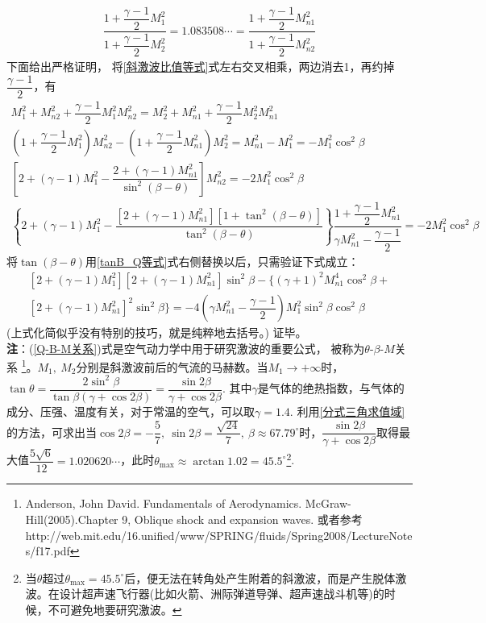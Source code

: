 \begin{enumerate}[label={【\textbf{例\thechapter.\arabic*}】},
 leftmargin=\inteval{\myenumleftmargin}pt,
 itemsep=\inteval{\myenumitempsep}pt,
 itemindent=\inteval{\myenumitemindent}pt]
\begin{align*}
    \dfrac{1+\dfrac{\gamma-1}{2}M_1^2}{1+\dfrac{\gamma-1}{2}M_2^2}
    =1.083508\cdots=
    \dfrac{1+\dfrac{\gamma-1}{2}M_{n1}^2}{1+\dfrac{\gamma-1}{2}M_{n2}^2}
\end{align*}
下面给出严格证明，
将\eqref{斜激波比值等式}式左右交叉相乘，两边消去1，再约掉$ \dfrac{\gamma-1}{2} $，有
\begin{gather*}
    M_1^2+M_{n2}^2+\dfrac{\gamma-1}{2}M_1^2M_{n2}^2=
    M_2^2+M_{n1}^2+\dfrac{\gamma-1}{2}M_2^2M_{n1}^2   \\
    \left(1+\dfrac{\gamma-1}{2}M_1^2\right)M_{n2}^2-
    \left(1+\dfrac{\gamma-1}{2}M_{n1}^2\right)M_{2}^2=M_{n1}^2-M_1^2
    =-M_1^2\cos^2\beta \\
    \left[2+(\gamma-1)M_1^2-\dfrac{2+(\gamma-1) M_{n1}^2}{\sin^2(\beta-\theta)}
    \right]M_{n2}^2=-2M_1^2\cos^2\beta \\
    \left\{2+(\gamma-1)M_1^2-\dfrac{[2+(\gamma-1) M_{n1}^2][1+
        \tan^2(\beta-\theta)]}{\tan^2(\beta-\theta)}
    \right\}\dfrac{1+\dfrac{\gamma-1}{2}M_{n1}^2}{\gamma M_{n1}^2
        -\dfrac{\gamma-1}{2}}=-2M_1^2\cos^2\beta
\end{gather*}
将$ \tan(\beta-\theta) $用\eqref{tanB_Q等式}式右侧替换以后，只需验证下式成立：
\begin{gather*}
    \left[2+(\gamma-1)M_1^2\right]\left[2+(\gamma-1)M_{n1}^2\right]\sin^2\beta-
    \Big\{(\gamma+1)^2M_{n1}^4\cos^2\beta+\\ [2+(\gamma-1) M_{n1}^2]^2
    \sin^2\beta \Big\}=-4\left(\gamma M_{n1}^2-\dfrac{\gamma-1}{2}\right)
    M_1^2\sin^2\beta\cos^2\beta
\end{gather*}
(上式化简似乎没有特别的技巧，就是纯粹地去括号。) 证毕。 \\
\textbf{注}：(\ref{Q-B-M关系})式是空气动力学中用于研究激波的重要公式，
被称为$ \theta$-$\beta$-$M$关系
\footnote{ Anderson, John David. Fundamentals of Aerodynamics. McGraw-Hill(2005).Chapter 9, Oblique shock and expansion waves. \quad  或者参考 http://web.mit.edu/16.unified/www/SPRING/fluids/Spring2008/LectureNotes/f17.pdf}。$ M_1,\ M_2 $分别是斜激波前后的气流的马赫数。当$ M_1\to +\infty $时，$ \tan\theta=\dfrac{2\sin^2\beta}{\tan\beta(\gamma+\cos2\beta)}=\dfrac{\sin2\beta}{\gamma+\cos2\beta} $. 其中$ \gamma $是气体的绝热指数，与气体的成分、压强、温度有关，对于常温的空气，可以取$ \gamma=1.4 $. 利用\ref{分式三角求值域}的方法，可求出当$ \cos2\beta=-\dfrac{5}{7},\ \sin2\beta=\dfrac{\sqrt{24}}{7},\ \beta\approx 67.79^{\circ} $时，$ \dfrac{\sin2\beta}{\gamma+\cos2\beta} $取得最大值$ \dfrac{5\sqrt{6}}{12}=1.020620\cdots $，此时$ \theta_{\max}\approx\arctan1.02=45.5^{\circ} $\footnote{当$ \theta $超过$ \theta_{\max}=45.5^{\circ} $后，便无法在转角处产生附着的斜激波，而是产生脱体激波。在设计超声速飞行器(比如火箭、洲际弹道导弹、超声速战斗机等)的时候，不可避免地要研究激波。}. \\

\end{enumerate}

